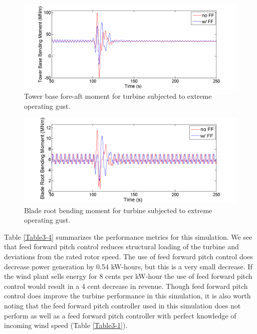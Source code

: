 \begin{figure}[htbp]
	\centering
		\includegraphics[trim = {1cm 0 2cm 0}, clip, width = \linewidth]{Figures/ch3Figures/fig3-28.png}
		
	\caption{Tower base fore-aft moment for turbine subjected to extreme operating gust.}
	\label{fig3-28}
\end{figure}

\begin{figure}[htbp]
	\centering
		\includegraphics[trim = {1cm 0 2cm 0}, clip, width = \linewidth]{Figures/ch3Figures/fig3-29.png}
		
	\caption{Blade root bending moment for turbine subjected to extreme operating gust.}
	\label{fig3-29}
\end{figure}

Table \ref{Table3-4} summarizes the performance metrics for this simulation. We see that feed forward pitch control reduces structural loading of the turbine and deviations from the rated rotor speed. The use of feed forward pitch control does decrease power generation by 0.54 kW-hours, but this is a very small decrease. If the wind plant sells energy for 8 cents per kW-hour the use of feed forward pitch control would result in a 4 cent decrease in revenue. Though feed forward pitch control does improve the turbine performance in this simulation, it is also worth noting that the feed forward pitch controller used in this simulation does not perform as well as a feed forward pitch controller with perfect knowledge of incoming wind speed (Table \ref{Table3-1}).


